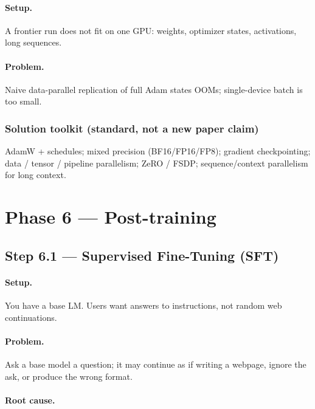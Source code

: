 \documentclass[11pt,a4paper]{article}
\begin{document}
\paragraph{Setup.}

A frontier run does not fit on one GPU: weights, optimizer states, activations, long sequences.


\paragraph{Problem.}

Naive data-parallel replication of full Adam states OOMs; single-device batch is too small.


\subsubsection{Solution toolkit (standard, not a new paper claim)}

AdamW + schedules; mixed precision (BF16/FP16/FP8); gradient checkpointing; data / tensor / pipeline parallelism; ZeRO / FSDP; sequence/context parallelism for long context.


\bigskip


\clearpage
\section{Phase 6 --- Post-training}


\subsection{Step 6.1 --- Supervised Fine-Tuning (SFT)}


\paragraph{Setup.}

You have a base LM. Users want answers to instructions, not random web continuations.


\paragraph{Problem.}

Ask a base model a question; it may continue as if writing a webpage, ignore the ask, or produce the wrong format.


\paragraph{Root cause.}
\end{document}
